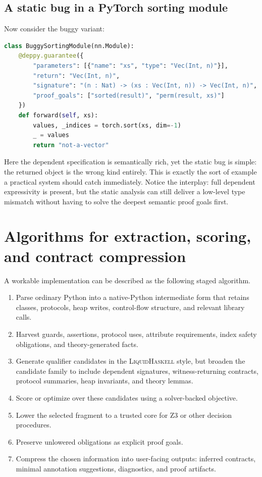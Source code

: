 \documentclass[11pt]{article}
\newcommand{\LiquidHaskell}{\textsc{LiquidHaskell}}
\newcommand{\Zthree}{\textsc{Z3}}
\theoremstyle{definition}
\theoremstyle{plain}
\begin{document}
\subsection{A static bug in a PyTorch sorting module}
Now consider the buggy variant:
\begin{lstlisting}[style=deppy,language=Python]
class BuggySortingModule(nn.Module):
    @deppy.guarantee({
        "parameters": [{"name": "xs", "type": "Vec(Int, n)"}],
        "return": "Vec(Int, n)",
        "signature": "(n : Nat) -> (xs : Vec(Int, n)) -> Vec(Int, n)",
        "proof_goals": ["sorted(result)", "perm(result, xs)"]
    })
    def forward(self, xs):
        values, _indices = torch.sort(xs, dim=-1)
        _ = values
        return "not-a-vector"
\end{lstlisting}
Here the dependent specification is semantically rich, yet the static bug is
simple: the returned object is the wrong kind entirely. This is exactly the sort
of example a practical system should catch immediately. Notice the interplay:
full dependent expressivity is present, but the static analysis can still deliver
a low-level type mismatch without having to solve the deepest semantic proof
goals first.



\section{Algorithms for extraction, scoring, and contract compression}

A workable implementation can be described as the following staged algorithm.

\begin{enumerate}[label=\arabic*.]
  \item Parse ordinary Python into a native-Python intermediate form that retains
  classes, protocols, heap writes, control-flow structure, and relevant library
  calls.
  \item Harvest guards, assertions, protocol uses, attribute requirements, index
  safety obligations, and theory-generated facts.
  \item Generate qualifier candidates in the \LiquidHaskell{} style, but broaden
  the candidate family to include dependent signatures, witness-returning
  contracts, protocol summaries, heap invariants, and theory lemmas.
  \item Score or optimize over these candidates using a solver-backed objective.
  \item Lower the selected fragment to a trusted core for \Zthree{} or other
  decision procedures.
  \item Preserve unlowered obligations as explicit proof goals.
  \item Compress the chosen information into user-facing outputs: inferred
  contracts, minimal annotation suggestions, diagnostics, and proof artifacts.
\end{enumerate}
\end{document}
